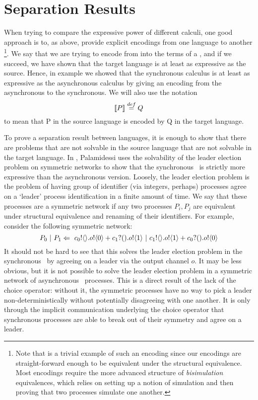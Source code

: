 \section{Separation Results}\label{Separation Results}
When trying to compare the expressive power of different calculi, one good approach is to, as above, provide explicit encodings from one language to another
\footnote{Note that  is a trivial example of such an encoding since our encodings are straight-forward enough to be equivalent under the structural equivalence.  
Most encodings require the more advanced structure of \emph{bisimulation} equivalences, which relies on setting up a notion of simulation and then proving that two processes simulate one another.}.  
We say that we are trying to encode from  into the terms of a , and if we succeed, we have shown that the target language is at least as expressive as the source.  
Hence, in example  we showed that the synchronous calculus is at least as expressive as the asynchronous calculus by giving an encoding from the asynchronous to the synchronous.  
We will also use the notation
\[
	\llbracket{P}\rrbracket \overset{\tiny{def}}{=} Q
\]
to mean that P in the source language is encoded by Q in the target language.

To prove a separation result between languages, it is enough to show that there are problems that are not solvable in the source language that are not solvable in the target language.  
In \cite{palam03}, Palamidessi uses the solvability of the leader election problem on symmetric networks to show that the synchronous \picalc\ is strictly more expressive than the asynchronous version.  
Loosely, the leader election problem is the problem of having group of identifier (via integers, perhaps) processes agree on a `leader' process identification in a finite amount of time.  
We say that these processes are a symmetric network if any two processes $P_i, P_j$ are equivalent under structural equivalence and renaming of their identifiers.  
For example, consider the following symmetric network:
\[
	P_0\ |\  P_1 \Leftarrow\  {c_0}!\langle{}\rangle. {o}!\langle{0}\rangle + {c_1}?({}). {o}!\langle{1}\rangle \ |\  {c_1}!\langle{}\rangle. {o}!\langle{1}\rangle + {c_0}?({}). {o}!\langle{0}\rangle
\]
It should not be hard to see that this solves the leader election problem in the synchronous \picalc\ by agreeing on a leader via the output channel $o$.  
It may be less obvious, but it is not possible to solve the leader election problem in a symmetric network of asynchronous \picalc\ processes.  
This is a direct result of the lack of the choice operator: without it, the symmetric processes have no way to pick a leader non-deterministically without potentially disagreeing with one another.  
It is only through the implicit communication underlying the choice operator that synchronous processes are able to break out of their symmetry and agree on a leader.

